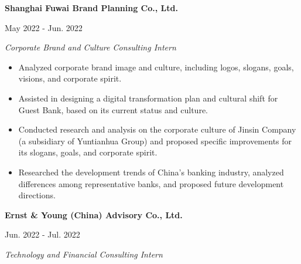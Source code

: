 \documentclass[
  16,
]{article}
\providecommand{\tightlist}{%
  \setlength{\itemsep}{0pt}\setlength{\parskip}{0pt}}\usepackage{longtable,booktabs,array}
\begin{document}
\begin{large}
  \begin{multicols}{2}
    \parbox{1.4\linewidth}{\bf Shanghai Fuwai Brand Planning Co., Ltd.}
    \begin{flushright}May 2022 - Jun. 2022\end{flushright}
  \end{multicols}
  \vspace{-0.17cm}
  \begin{multicols}{2}
    \begin{flushleft}\textit{Corporate Brand and Culture Consulting Intern}\end{flushleft}
    \begin{flushright}  \end{flushright}\end
  {multicols}
\end{large}
\vspace{-0.16cm}

\begin{itemize}
\tightlist
\item
  Analyzed corporate brand image and culture, including logos, slogans,
  goals, visions, and corporate spirit.
\item
  Assisted in designing a digital transformation plan and cultural shift
  for Guest Bank, based on its current status and culture.
\item
  Conducted research and analysis on the corporate culture of Jinsin
  Company (a subsidiary of Yuntianhua Group) and proposed specific
  improvements for its slogans, goals, and corporate spirit.
\item
  Researched the development trends of China's banking industry,
  analyzed differences among representative banks, and proposed future
  development directions.
\end{itemize}

\vspace{7pt}

\begin{large}
  \begin{multicols}{2}
    \parbox{1.4\linewidth}{\bf Ernst & Young (China) Advisory Co., Ltd.}
    \begin{flushright}Jun. 2022 - Jul. 2022\end{flushright}
  \end{multicols}
  \vspace{-0.17cm}
  \begin{multicols}{2}
    \begin{flushleft}\textit{Technology and Financial Consulting Intern}\end{flushleft}
    \begin{flushright}  \end{flushright}\end
  {multicols}
\end{large}
\vspace{-0.16cm}
\end{document}

